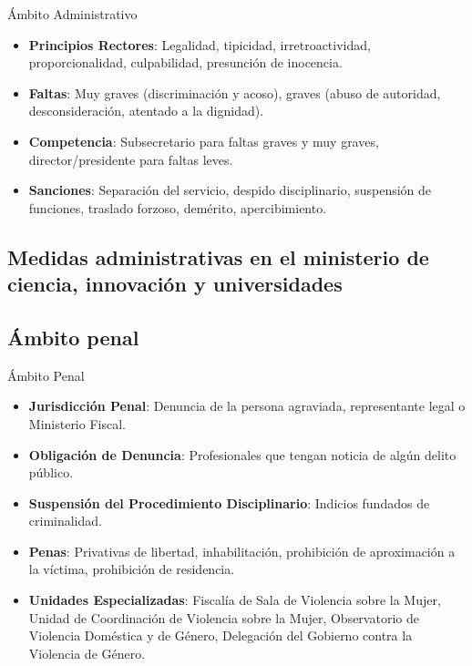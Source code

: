 \documentclass{beamer}
\begin{document}
    \begin{frame}{Ámbito Administrativo}
        \begin{itemize}
            \item \textbf{Principios Rectores}: Legalidad, tipicidad, irretroactividad, proporcionalidad, culpabilidad, presunción de inocencia.
            \item \textbf{Faltas}: Muy graves (discriminación y acoso), graves (abuso de autoridad, desconsideración, atentado a la dignidad).
            \item \textbf{Competencia}: Subsecretario para faltas graves y muy graves, director/presidente para faltas leves.
            \item \textbf{Sanciones}: Separación del servicio, despido disciplinario, suspensión de funciones, traslado forzoso, demérito, apercibimiento.
        \end{itemize}
    \end{frame}

    \subsection{Medidas administrativas en el ministerio de ciencia, innovación y universidades}

    \subsection{Ámbito penal}
    \begin{frame}{Ámbito Penal}
        \begin{itemize}
            \item \textbf{Jurisdicción Penal}: Denuncia de la persona agraviada, representante legal o Ministerio Fiscal.
            \item \textbf{Obligación de Denuncia}: Profesionales que tengan noticia de algún delito público.
            \item \textbf{Suspensión del Procedimiento Disciplinario}: Indicios fundados de criminalidad.
            \item \textbf{Penas}: Privativas de libertad, inhabilitación, prohibición de aproximación a la víctima, prohibición de residencia.
            \item \textbf{Unidades Especializadas}: Fiscalía de Sala de Violencia sobre la Mujer, Unidad de Coordinación de Violencia sobre la Mujer, Observatorio de Violencia Doméstica y de Género, Delegación del Gobierno contra la Violencia de Género.
        \end{itemize}
    \end{frame}
\end{document}
